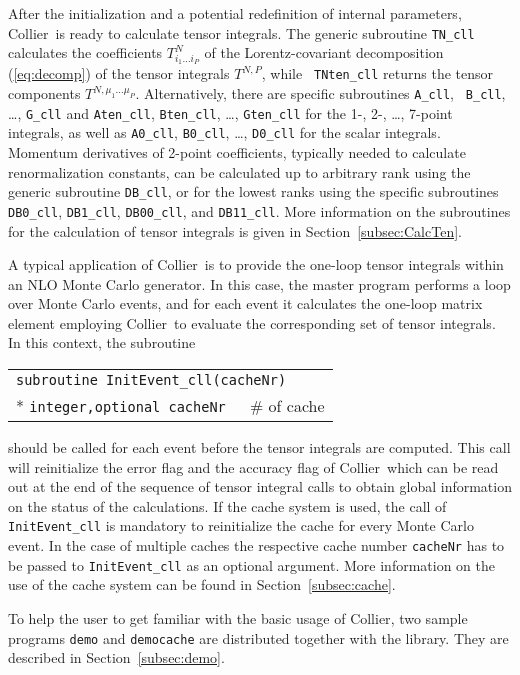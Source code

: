 \documentclass[preprint,sort&compress,12pt]{elsarticle}
\makeatletter
\def\bce{\begin{center}}
\def\ece{\end{center}}
\def\refeq#1{\mbox{(\ref{#1})}}
\def\refse#1{\mbox{Section~\ref{#1}}}
\newcommand{\collier}{{\sc Collier}}
\newlength{\parwidth}\newlength{\colonewidth}%
\newlength{\restpageheight}
\newcommand{\cpcsuptable}[2]
{\settowidth{\colonewidth}{#1}\setlength{\parwidth}{\textwidth}%
\addtolength{\parwidth}{-\colonewidth}\addtolength{\parwidth}{-3em}%
\bce
\setlength{\restpageheight}{\@colroom}\addtolength{\restpageheight}{-\pagetotal}
\ifdim \restpageheight<20pt \pagebreak\fi
\begin{supertabular}[l]{p{\colonewidth}@{ }c@{ }p{\parwidth}}
#2
\end{supertabular}%
\ece
}%
\renewcommand{\cpcsuptable}[2]%
{\settowidth{\colonewidth}{#1}\setlength{\parwidth}{\textwidth}%
\addtolength{\parwidth}{-\colonewidth}\addtolength{\parwidth}{-3em}%
\begin{center}
\setlength{\restpageheight}{\@colroom}\addtolength{\restpageheight}{-\pagetotal}%
\ifdim \restpageheight<20pt \pagebreak\fi
\begin{supertabular}[l]{p{\colonewidth}@{ : }p{\parwidth}}%
#2
\end{supertabular}%
\end{center}
}%
\makeatother
\begin{document}
After the initialization and a potential redefinition of internal
parameters, \collier\ is ready to calculate tensor integrals. The
generic subroutine {\tt TN\_cll} calculates the coefficients
$T^N_{i_1\dots i_P}$ of the Lorentz-covariant decomposition
\refeq{eq:decomp} of the tensor integrals $T^{N,P}$, while {\tt
  TNten\_cll} returns the 
tensor components $T^{N,\mu_1\dots\mu_P}$.
Alternatively, there are specific subroutines {\tt A\_cll}, {\tt
  B\_cll}, \ldots, {\tt G\_cll} and {\tt Aten\_cll}, {\tt Bten\_cll},
\ldots, {\tt Gten\_cll} for the 1-, 2-, \ldots, 7-point integrals, as well as
{\tt A0\_cll}, {\tt B0\_cll}, \ldots, {\tt D0\_cll}
for the scalar integrals. 
Momentum derivatives of 2-point coefficients,
typically needed to calculate renormalization constants, can be calculated up
to arbitrary rank using the generic subroutine {\tt DB\_cll}, or for the lowest ranks using the
specific subroutines {\tt DB0\_cll}, {\tt DB1\_cll}, {\tt DB00\_cll},
and {\tt DB11\_cll}. More information on the
subroutines for the calculation of tensor integrals is given in \refse{subsec:CalcTen}.

A typical application of \collier\ is to provide 
the one-loop tensor integrals
within an NLO Monte Carlo generator. In this case, the master program performs a loop over 
Monte Carlo events, and for each event it calculates the one-loop matrix element
employing \collier\ to evaluate the corresponding set of tensor integrals. 
In this context, the subroutine
\cpcsuptable{\tt integer,optional cacheNr}{%
\multicolumn{2}{l}{\tt subroutine  InitEvent\_cll(cacheNr)}\\*
\tt integer,optional cacheNr & $\#$ of cache\\ 
}    
should be called for each event before the tensor integrals are computed. 
This call will reinitialize the error flag and the accuracy flag of \collier\ which
can be read out at the end of the sequence of tensor integral calls to obtain global information 
on the status of the calculations. If the cache system is used, the call of {\tt InitEvent\_cll} is
mandatory to reinitialize the cache for every Monte Carlo event. In the case of multiple caches the
respective cache number {\tt cacheNr}
has to be passed to {\tt InitEvent\_cll} as an optional argument. More information
on the use of the cache system can be found in \refse{subsec:cache}.

To help the user to get familiar with the basic usage of \collier,
two sample programs {\tt demo} and {\tt democache} are distributed together with the library. 
They are described in \refse{subsec:demo}. 
 
\end{document}
